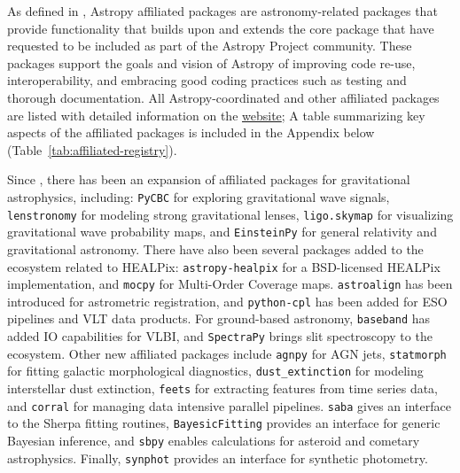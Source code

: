 \documentclass[modern]{aastex631}
\begin{document}
As defined in \paperii, Astropy affiliated packages are astronomy-related
\python packages that provide functionality that builds upon and extends the
\astropypkg core package that have requested to be included as part of the
Astropy Project community. These packages support the goals and vision of
Astropy of improving code re-use, interoperability, and embracing good coding
practices such as testing and thorough documentation.
All Astropy-coordinated and other affiliated packages are listed with detailed
information on the \href{{https://www.astropy.org/affiliated}}{\astropy
website}; A table summarizing key aspects of the affiliated packages is included
in the Appendix below (Table~\ref{tab:affiliated-registry}).

Since \paperii, there has been an expansion of affiliated
packages for gravitational astrophysics, including:
\texttt{PyCBC} for exploring gravitational wave signals, \texttt{lenstronomy} for
modeling strong gravitational lenses, \texttt{ligo.skymap} for visualizing
gravitational wave probability maps, and \texttt{EinsteinPy} for general
relativity and gravitational astronomy. There have also been several packages
added to the ecosystem related to HEALPix: \texttt{astropy-healpix}
for a BSD-licensed HEALPix implementation, and \texttt{mocpy} for Multi-Order
Coverage maps. \texttt{astroalign} has been introduced for astrometric registration,
and \texttt{python-cpl} has been added for ESO pipelines and VLT data products.
For ground-based astronomy, \texttt{baseband} has added IO capabilities for
VLBI, and \texttt{SpectraPy} brings slit spectroscopy to the \astropy ecosystem.
Other new affiliated packages include \texttt{agnpy} for AGN jets,
\texttt{statmorph} for fitting galactic morphological diagnostics,
\texttt{dust\_extinction} for modeling interstellar dust extinction,
\texttt{feets} for extracting features from time series data, and
\texttt{corral} for managing data intensive parallel pipelines.
\texttt{saba} gives an interface to the Sherpa \citep{sherpa} fitting routines,
\texttt{BayesicFitting} provides an interface for generic Bayesian inference,
and \texttt{sbpy} enables calculations for asteroid and
cometary astrophysics. Finally, \texttt{synphot} provides an interface for
synthetic photometry.
\end{document}

